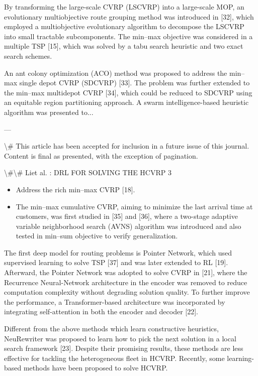 \documentclass{article}
\begin{document}
	By transforming the large-scale CVRP (LSCVRP) into a large-scale MOP, an evolutionary multiobjective route grouping method was introduced in [32], which employed a multiobjective evolutionary algorithm to decompose the LSCVRP into small tractable subcomponents. The min–max objective was considered in a multiple TSP [15], which was solved by a tabu search heuristic and two exact search schemes.
	
	An ant colony optimization (ACO) method was proposed to address the min–max single depot CVRP (SDCVRP) [33]. The problem was further extended to the min–max multidepot CVRP [34], which could be reduced to SDCVRP using an equitable region partitioning approach. A swarm intelligence-based heuristic algorithm was presented to...
	
	---
	
	\textbackslash{}# This article has been accepted for inclusion in a future issue of this journal. Content is final as presented, with the exception of pagination.
	
	\textbackslash{}#\textbackslash{}# Liet al. : DRL FOR SOLVING THE HCVRP 3
	
	\begin{itemize}
		\item Address the rich min–max CVRP [18].
		\item The min–max cumulative CVRP, aiming to minimize the last arrival time at customers, was first studied in [35] and [36], where a two-stage adaptive variable neighborhood search (AVNS) algorithm was introduced and also tested in min–sum objective to verify generalization.
	\end{itemize}
	
	The first deep model for routing problems is Pointer Network, which used supervised learning to solve TSP [37] and was later extended to RL [19]. Afterward, the Pointer Network was adopted to solve CVRP in [21], where the Recurrence Neural-Network architecture in the encoder was removed to reduce computation complexity without degrading solution quality. To further improve the performance, a Transformer-based architecture was incorporated by integrating self-attention in both the encoder and decoder [22].
	
	Different from the above methods which learn constructive heuristics, NeuRewriter was proposed to learn how to pick the next solution in a local search framework [23]. Despite their promising results, these methods are less effective for tackling the heterogeneous fleet in HCVRP. Recently, some learning-based methods have been proposed to solve HCVRP.
	
\end{document}
